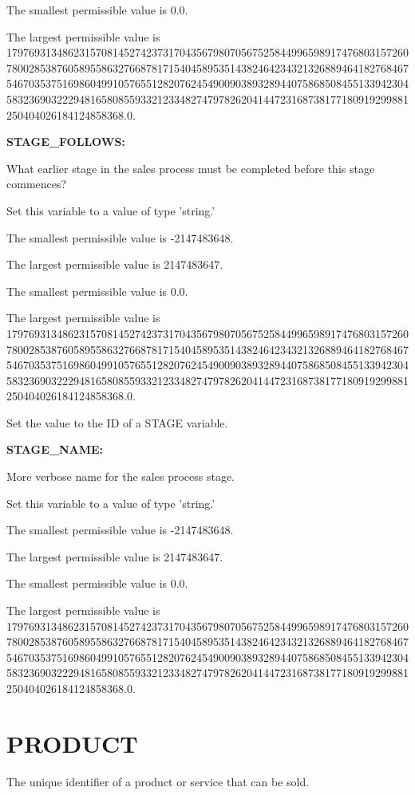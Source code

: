 The smallest permissible value is 0.0.

The largest permissible value is 179769313486231570814527423731704356798070567525844996598917476803157260780028538760589558632766878171540458953514382464234321326889464182768467546703537516986049910576551282076245490090389328944075868508455133942304583236903222948165808559332123348274797826204144723168738177180919299881250404026184124858368.0.


\textbf{STAGE\_FOLLOWS:}


What earlier stage in the sales process must be completed before this stage commences?

Set this variable to a value of type 'string.'

The smallest permissible value is -2147483648.

The largest permissible value is 2147483647.

The smallest permissible value is 0.0.

The largest permissible value is 179769313486231570814527423731704356798070567525844996598917476803157260780028538760589558632766878171540458953514382464234321326889464182768467546703537516986049910576551282076245490090389328944075868508455133942304583236903222948165808559332123348274797826204144723168738177180919299881250404026184124858368.0.

Set the value to the ID of a STAGE variable.


\textbf{STAGE\_NAME:}


More verbose name for the sales process stage.

Set this variable to a value of type 'string.'

The smallest permissible value is -2147483648.

The largest permissible value is 2147483647.

The smallest permissible value is 0.0.

The largest permissible value is 179769313486231570814527423731704356798070567525844996598917476803157260780028538760589558632766878171540458953514382464234321326889464182768467546703537516986049910576551282076245490090389328944075868508455133942304583236903222948165808559332123348274797826204144723168738177180919299881250404026184124858368.0.


\section{PRODUCT}


The unique identifier of a product or service that can be sold.

